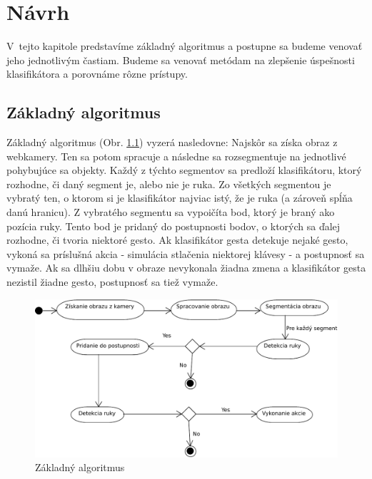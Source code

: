 
\chapter{Návrh}\label{chap:design}

V~tejto kapitole predstavíme základný algoritmus a postupne sa budeme venovať jeho jednotlivým častiam. Budeme sa venovať metódam na zlepšenie úspešnosti klasifikátora a porovnáme rôzne prístupy. 
\bigskip

\section{Základný algoritmus}

Základný algoritmus (Obr. \ref{fig:base_alg}) vyzerá nasledovne: 
Najskôr sa získa obraz z webkamery. Ten sa potom spracuje a následne sa rozsegmentuje na jednotlivé pohybujúce sa objekty.
Každý z týchto segmentov sa predloží klasifikátoru, ktorý rozhodne, či daný segment je, alebo nie je ruka. Zo všetkých segmentou je vybratý ten, o ktorom si je klasifikátor najviac istý, že je ruka (a zároveň spĺňa danú hranicu). Z vybratého segmentu sa vypoičíta bod, ktorý je braný ako pozícia ruky. Tento bod je pridaný do postupnosti bodov, o ktorých sa ďalej rozhodne, či tvoria niektoré gesto. Ak klasifikátor gesta detekuje nejaké gesto, vykoná sa príslušná akcia - simulácia stlačenia niektorej klávesy - a postupnosť sa vymaže. Ak sa dlhšiu dobu v obraze nevykonala žiadna zmena a klasifikátor gesta nezistil žiadne gesto, postupnosť sa tiež vymaže.

\begin{figure}[htp]
    \centering
    \includegraphics[width=\textwidth]{images/BaseAlgorithm}
    \caption{Základný algoritmus}
    \label{fig:base_alg}
\end{figure}

